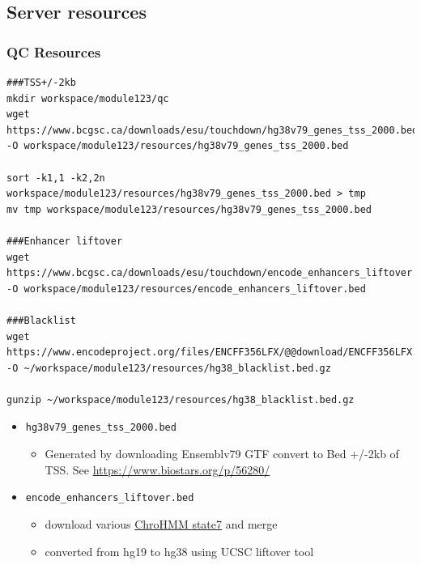 \documentclass[
]{book}
\providecommand{\tightlist}{%
  \setlength{\itemsep}{0pt}\setlength{\parskip}{0pt}}
\begin{document}
\subsection{Server resources}\label{server-resources}

\subsubsection{QC Resources}\label{qc-resources}

\begin{verbatim}
###TSS+/-2kb
mkdir workspace/module123/qc
wget https://www.bcgsc.ca/downloads/esu/touchdown/hg38v79_genes_tss_2000.bed -O workspace/module123/resources/hg38v79_genes_tss_2000.bed

sort -k1,1 -k2,2n workspace/module123/resources/hg38v79_genes_tss_2000.bed > tmp
mv tmp workspace/module123/resources/hg38v79_genes_tss_2000.bed

###Enhancer liftover
wget https://www.bcgsc.ca/downloads/esu/touchdown/encode_enhancers_liftover.bed -O workspace/module123/resources/encode_enhancers_liftover.bed

###Blacklist
wget https://www.encodeproject.org/files/ENCFF356LFX/@@download/ENCFF356LFX.bed.gz -O ~/workspace/module123/resources/hg38_blacklist.bed.gz

gunzip ~/workspace/module123/resources/hg38_blacklist.bed.gz
\end{verbatim}

\begin{itemize}
\tightlist
\item
  \texttt{hg38v79\_genes\_tss\_2000.bed}

  \begin{itemize}
  \tightlist
  \item
    Generated by downloading Ensemblv79 GTF convert to Bed +/-2kb of TSS. See \url{https://www.biostars.org/p/56280/}
  \end{itemize}
\item
  \texttt{encode\_enhancers\_liftover.bed}

  \begin{itemize}
  \tightlist
  \item
    download various \href{https://egg2.wustl.edu/roadmap/data/byFileType/chromhmmSegmentations/ChmmModels/coreMarks/jointModel/final/}{ChroHMM state7} and merge
  \item
    converted from hg19 to hg38 using UCSC liftover tool
  \end{itemize}
\end{itemize}
\end{document}
